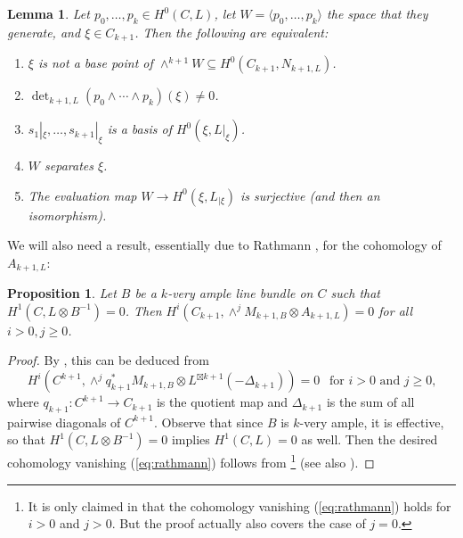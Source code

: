 \documentclass[12pt]{amsart}
\newcounter{thmcounter}
\numberwithin{equation}{section}
\numberwithin{thmcounter}{section}
\newtheorem{proposition}[thmcounter]{Proposition}
\newtheorem{lemma}[thmcounter]{Lemma}
\theoremstyle{definition}
\theoremstyle{claim}
\begin{document}
\begin{lemma}\label{lem:A(p_1...p_m)(D)=0}
	Let $p_0, \ldots, p_{k} \in H^0(C, L)$, let $W = \langle p_0,\dots,p_{k} \rangle$ the space that they generate,  and $\xi \in C_{k+1}$. Then the following are equivalent:
	\begin{enumerate}
		\item $\xi$ is not a base point of $\wedge^{k+1}W\subseteq H^0(C_{k+1},N_{k+1,L})$.
		\item  $\det_{k+1,L}(p_0 \wedge \cdots \wedge p_{k})(\xi) \neq 0$.
		\item $s_1|_{\xi}, \ldots, s_{k+1}|_{\xi}$ is a basis of $H^0(\xi, L|_{\xi})$.
		\item $W$ separates $\xi$.
		\item The evaluation map $W\to H^0(\xi,L_{|\xi})$ is surjective (and then an isomorphism).
		\end{enumerate}
\end{lemma}

We will also need a result, essentially due to Rathmann \cite{Rathmann}, for the cohomology of $A_{k+1,L}$:

\begin{proposition}\label{prop:rathmannvanishing}
	Let $B$ be a $k$-very ample line bundle on $C$ such that $H^1(C,L\otimes B^{-1})=0$. Then $H^i(C_{k+1},\wedge^j M_{k+1,B}\otimes A_{k+1,L}) = 0$ for all $i>0,j\geq 0$.
\end{proposition}
\begin{proof}
	By \cite[Lemma 3.5]{ENP}, this can be deduced from
	\begin{equation}\label{eq:rathmann}
		H^i(C^{k+1}, \wedge^j q_{k+1}^* M_{k+1,B} \otimes L^{\boxtimes k+1} (-\Delta_{k+1}))=0~~\text{ for $i > 0$ and $j \geq 0$,}
	\end{equation}
	where $q_{k+1} \colon C^{k+1} \to C_{k+1}$ is the quotient map and $\Delta_{k+1}$ is the sum of all pairwise diagonals of $C^{k+1}$. Observe that since $B$ is $k$-very ample, it is effective, so that $H^1(C,L\otimes B^{-1})=0$ implies $H^1(C,L)=0$ as well. Then the desired cohomology vanishing (\ref{eq:rathmann}) follows from \cite[Theorem 3.1]{Rathmann}\footnote{It is only claimed in \cite[Theorem 3.1]{Rathmann} that the cohomology vanishing (\ref{eq:rathmann}) holds for $i>0$ and $j>0$. But the proof actually also covers the case of $j=0$.} (see also \cite[Theorem 4.1]{ENP}).
\end{proof}
\end{document}

